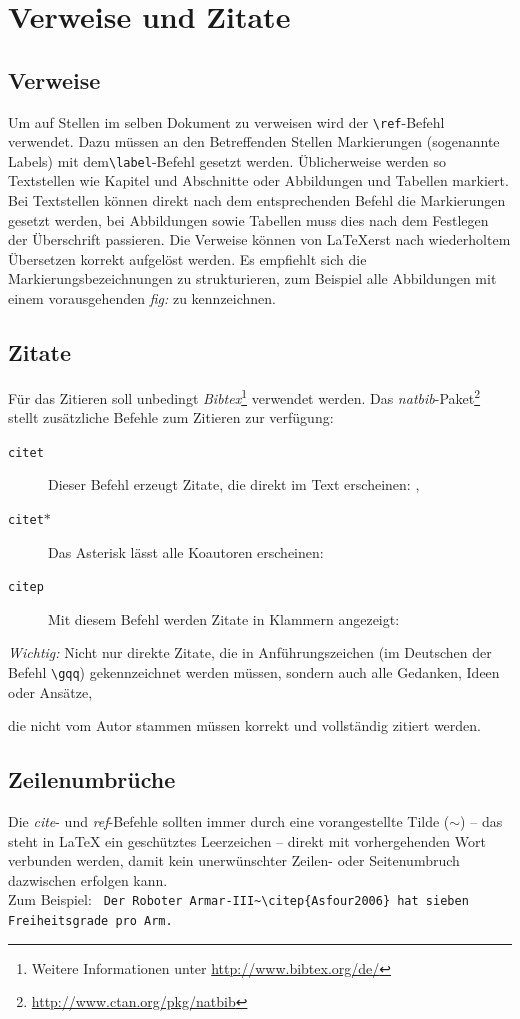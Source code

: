 \documentclass[english,ngerman]{KITreprt}
\begin{document}
\section{Verweise und Zitate}
\subsection{Verweise}
\label{sec:ref}
Um auf Stellen im selben Dokument zu verweisen wird der \lstinline[language={[LaTeX]TeX}]!\ref!-Befehl verwendet.
Dazu m\"ussen an den Betreffenden Stellen Markierungen (sogenannte Labels) mit dem\lstinline[language={[LaTeX]TeX}]!\label!-Befehl gesetzt werden.
\"Ublicherweise werden so Textstellen wie Kapitel und Abschnitte oder Abbildungen und Tabellen markiert.
Bei Textstellen k\"onnen direkt nach dem entsprechenden Befehl die Markierungen gesetzt werden, bei Abbildungen sowie Tabellen muss dies nach dem Festlegen der \"Uberschrift passieren. 
Die Verweise k\"onnen von \LaTeX erst nach wiederholtem \"Ubersetzen korrekt aufgel\"ost werden.
Es empfiehlt sich die Markierungsbezeichnungen zu strukturieren, zum Beispiel alle Abbildungen mit einem vorausgehenden \emph{fig:} zu kennzeichnen.
\subsection{Zitate}
F\"ur das Zitieren soll unbedingt \emph{Bibtex}\footnote{Weitere Informationen unter \url{http://www.bibtex.org/de/}} verwendet werden.
Das \emph{natbib}-Paket\footnote{\url{http://www.ctan.org/pkg/natbib}} stellt zus\"atzliche Befehle zum Zitieren zur verf\"ugung:
\begin{description}
\item[\texttt{citet}] Dieser Befehl erzeugt Zitate, die direkt im Text erscheinen: \citet{Asfour2006}, 
\item[\texttt{citet}$\ast$] Das Asterisk l\"asst alle Koautoren erscheinen: \citet*{Asfour2006}
\item[\texttt{citep}] Mit diesem Befehl werden Zitate in Klammern angezeigt: \citep{Asfour2006}
\end{description}
\emph{Wichtig:} Nicht nur direkte Zitate, die in Anf\"uhrungszeichen (im Deutschen der Befehl \lstinline[language={[LaTeX]TeX}]!\gqq!) gekennzeichnet werden m\"ussen, sondern auch alle Gedanken, Ideen oder Ans\"atze,

die nicht vom Autor stammen m\"ussen korrekt und vollst\"andig zitiert werden.
\subsection{Zeilenumbr\"uche}
Die \emph{cite}- und \emph{ref}-Befehle sollten immer durch eine vorangestellte Tilde ($\sim$) -- das steht in \LaTeX{} ein gesch\"utztes Leerzeichen -- direkt mit vorhergehenden Wort verbunden werden, damit kein unerw\"unschter
Zeilen- oder Seitenumbruch dazwischen erfolgen kann.\\
Zum Beispiel: \lstinline[language={[LaTeX]TeX},morekeywords={citep}]! Der Roboter Armar-III~\citep{Asfour2006} hat sieben Freiheitsgrade pro Arm.!
\end{document}
